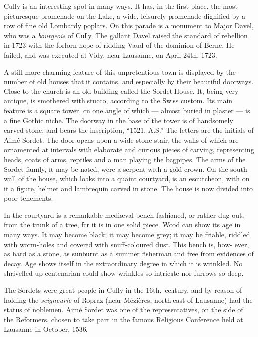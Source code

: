 \documentclass[11pt,a4paper,twocolumn]{article}
\begin{document}
Cully is an interesting spot in many ways. It has, in the first place, the
most picturesque promenade on the Lake, a wide, leisurely promenade dignified
by a row of fine old Lombardy poplars. On this parade is a monument to
\mbox{Major} Davel, who was a \emph{bourgeois} of Cully. The gallant Davel
raised the standard of rebellion in 1723 with the forlorn hope of ridding
Vaud of the dominion of Berne. He failed, and was executed at Vidy, near
Lausanne, on April 24th, 1723.

A still more charming feature of this unpretentious town is displayed by the
number of old houses that it contains, and especially by their beautiful
doorways. Close to the church is an old building called the Sordet House. It,
being very antique, is smothered with stucco, according to the Swiss custom.
Its main feature is a square tower, on one angle of which --- almost buried
in plaster --- is a fine Gothic niche. The doorway in the base of the tower
is of handsomely carved stone, and bears the inscription, ``1521. A.S.'' The
letters are the initials of Aim\'{e} Sordet. The door opens upon a wide stone
stair, the walls of which are ornamented at intervals with elaborate and
curious pieces of carving, representing heads, coats of arms, reptiles and a
man playing the bagpipes. The arms of the Sordet family, it may be noted,
were a serpent with a gold crown. On the south wall of the house, which looks
into a quaint courtyard, is an escutcheon, with on it a figure, helmet and
lambrequin carved in stone. The house is now divided into poor tenements.

In the courtyard is a remarkable medi\ae val bench fashioned, or rather dug
out, from the trunk of a tree, for it is in one solid piece. Wood can show
its age in many ways. It may become black; it may become grey; it may be
friable, riddled with worm-holes and covered with snuff-coloured dust. This
bench is, how- ever, as hard as a stone, as sunburnt as a summer fisherman
and free from evidences of decay. Age shows itself in the extraordinary
degree in which it is wrinkled. No shrivelled-up centenarian could show
wrinkles so intricate nor furrows so deep.

The Sordets were great people in Cully in the 16th.\ century, and by reason
of holding the \emph{seigneurie} of Ropraz (near M\'{e}zi\`{e}res, north-east of
Lausanne) had the status of noblemen. Aim\'{e} Sordet was one of the
representatives, on the side of the Reformers, chosen to take part in the
famous Religious Conference held at Lausanne in October, 1536.
\end{document}
